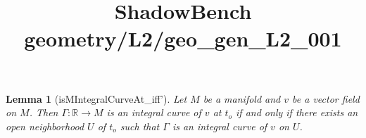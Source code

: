 \documentclass{article}
\title{ShadowBench geometry/L2/geo\_gen\_L2\_001}
\newtheorem{lemma}{Lemma}
\begin{document}
\maketitle

\begin{lemma}[isMIntegralCurveAt_iff']
Let $M$ be a manifold and $v$ be a vector field on $M$. Then $\Gamma : ℝ → M$ is an integral curve of $v$ at $t_o$ 
if and only if there exists an open neighborhood $U$ of $t_o$ such that $\Gamma$ is an integral curve of $v$ on $U$.
\end{lemma}
\end{document}
